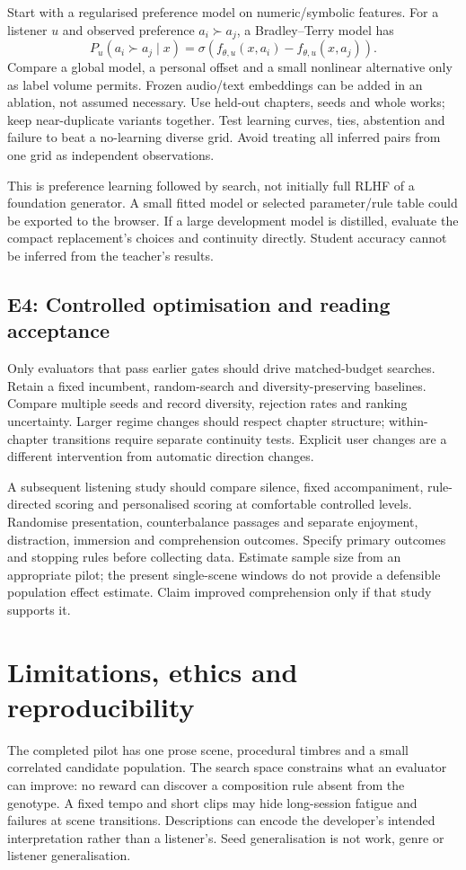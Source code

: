 \documentclass[11pt]{article}
\begin{document}
Start with a regularised preference model on numeric/symbolic features. For a listener $u$ and observed preference $a_i\succ a_j$, a Bradley--Terry model has
\begin{equation}
 P_u(a_i\succ a_j\mid x)=\sigma\left(f_{\theta,u}(x,a_i)-f_{\theta,u}(x,a_j)\right).
\end{equation}
Compare a global model, a personal offset and a small nonlinear alternative only as label volume permits. Frozen audio/text embeddings can be added in an ablation, not assumed necessary. Use held-out chapters, seeds and whole works; keep near-duplicate variants together. Test learning curves, ties, abstention and failure to beat a no-learning diverse grid. Avoid treating all inferred pairs from one grid as independent observations.

This is preference learning followed by search, not initially full RLHF of a foundation generator. A small fitted model or selected parameter/rule table could be exported to the browser. If a large development model is distilled, evaluate the compact replacement's choices and continuity directly. Student accuracy cannot be inferred from the teacher's results.

\subsection{E4: Controlled optimisation and reading acceptance}
Only evaluators that pass earlier gates should drive matched-budget searches. Retain a fixed incumbent, random-search and diversity-preserving baselines. Compare multiple seeds and record diversity, rejection rates and ranking uncertainty. Larger regime changes should respect chapter structure; within-chapter transitions require separate continuity tests. Explicit user changes are a different intervention from automatic direction changes.

A subsequent listening study should compare silence, fixed accompaniment, rule-directed scoring and personalised scoring at comfortable controlled levels. Randomise presentation, counterbalance passages and separate enjoyment, distraction, immersion and comprehension outcomes. Specify primary outcomes and stopping rules before collecting data. Estimate sample size from an appropriate pilot; the present single-scene windows do not provide a defensible population effect estimate. Claim improved comprehension only if that study supports it.

\section{Limitations, ethics and reproducibility}
The completed pilot has one prose scene, procedural timbres and a small correlated candidate population. The search space constrains what an evaluator can improve: no reward can discover a composition rule absent from the genotype. A fixed tempo and short clips may hide long-session fatigue and failures at scene transitions. Descriptions can encode the developer's intended interpretation rather than a listener's. Seed generalisation is not work, genre or listener generalisation.
\end{document}

